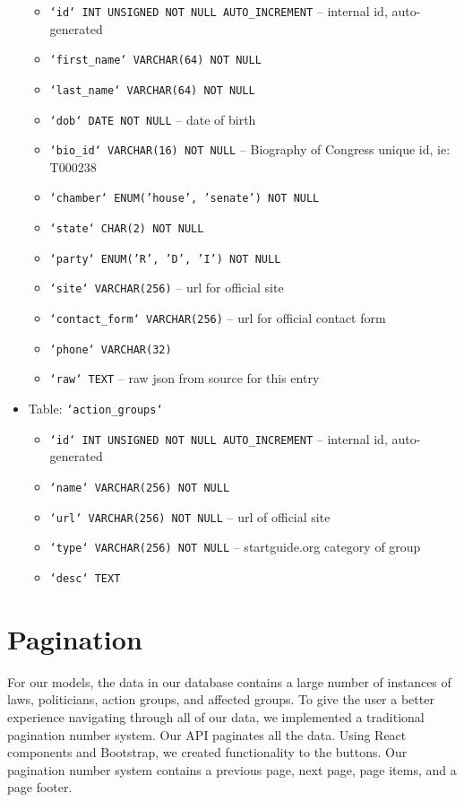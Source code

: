 \documentclass[12pt]{article}
\newcommand{\code}[1]{\texttt{#1}}
\begin{document}
\begin{itemize}
\begin{itemize}
		\item \code{`id` INT UNSIGNED NOT NULL AUTO\_INCREMENT}	-- internal id, auto-generated
		\item \code{`first\_name` VARCHAR(64) NOT NULL}
		\item \code{`last\_name` VARCHAR(64) NOT NULL}
		\item \code{`dob` DATE NOT NULL}						-- date of birth
		\item \code{`bio\_id` VARCHAR(16) NOT NULL}				-- Biography of Congress unique id, ie: T000238
		\item \code{`chamber` ENUM('house', 'senate') NOT NULL}
		\item \code{`state` CHAR(2) NOT NULL}
		\item \code{`party` ENUM('R', 'D', 'I') NOT NULL}
		\item \code{`site` VARCHAR(256)}						-- url for official site
		\item \code{`contact\_form` VARCHAR(256)}				-- url for official contact form
		\item \code{`phone` VARCHAR(32)}
		\item \code{`raw` TEXT}									-- raw json from source for this entry
	\end{itemize}
	\item[] Table: \code{`action\_groups`}
	\begin{itemize}
		\item \code{`id` INT UNSIGNED NOT NULL AUTO\_INCREMENT}	-- internal id, auto-generated
		\item \code{`name` VARCHAR(256) NOT NULL}
		\item \code{`url` VARCHAR(256) NOT NULL}				-- url of official site
		\item \code{`type` VARCHAR(256) NOT NULL}				-- startguide.org category of group
		\item \code{`desc` TEXT}
	\end{itemize}
\end{itemize}


\section{Pagination}

For our models, the data in our database contains a large number of instances of laws, politicians, action groups, and affected groups. To give the user a better experience navigating through all of our data, we implemented a traditional pagination number system. Our API paginates all the data. Using React components and Bootstrap, we created functionality to the buttons. Our pagination number system contains a previous page, next page, page items, and a page footer.
\end{document}
